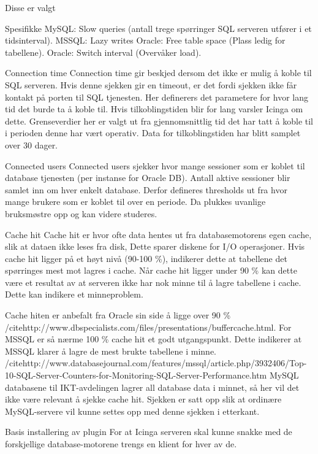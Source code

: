 Disse er valgt

Spesifikke
MySQL: Slow queries (antall trege spørringer SQL serveren utfører i et tidsinterval).
MSSQL: Lazy writes
Oracle: Free table space (Plass ledig for tabellene).
Oracle: Switch interval (Overvåker load).


Connection time
Connection time gir beskjed dersom det ikke er mulig å koble til SQL serveren. Hvis denne sjekken gir en timeout, er det fordi sjekken ikke får kontakt på porten til SQL tjenesten. Her definerers det parametere for hvor lang tid det burde ta å koble til. Hvis tilkoblingstiden blir for lang varsler Icinga om dette. Grenseverdier her er valgt ut fra gjennomsnittlig tid det har tatt å koble til i perioden denne har vært operativ. Data for tilkoblingstiden har blitt samplet over 30 dager.

Connected users
Connected users sjekker hvor mange sessioner som er koblet til database tjenesten (per instanse for Oracle DB). Antall aktive sessioner blir samlet inn om hver enkelt database. Derfor defineres thresholds ut fra hvor mange brukere som er koblet til over en periode. Da plukkes uvanlige bruksmøstre opp og kan videre studeres.

Cache hit
Cache hit er hvor ofte data hentes ut fra databasemotorens egen cache, slik at dataen ikke leses fra disk, Dette sparer diskene for I/O operasjoner. Hvis cache hit ligger på et høyt nivå (90-100 \%), indikerer dette at tabellene det spørringes mest mot lagres i cache. Når cache hit ligger under 90 \% kan dette være et resultat av at serveren ikke har nok minne til å lagre tabellene i cache. Dette kan indikere et minneproblem.

Cache hiten er anbefalt fra Oracle sin side å ligge over 90 \% /cite{http://www.dbspecialists.com/files/presentations/buffercache.html}. 
For MSSQL er så nærme 100 \% cache hit et godt utgangspunkt. Dette indikerer at MSSQL klarer å lagre de mest brukte tabellene i minne. /cite{http://www.databasejournal.com/features/mssql/article.php/3932406/Top-10-SQL-Server-Counters-for-Monitoring-SQL-Server-Performance.htm}
MySQL databasene til IKT-avdelingen lagrer all database data i minnet, så her vil det ikke være relevant å sjekke cache hit. Sjekken er satt opp slik at ordinære MySQL-servere vil kunne settes opp med denne sjekken i etterkant.

Basis installering av plugin 
For at Icinga serveren skal kunne snakke med de forskjellige database-motorene trengs en klient for hver av de. 

